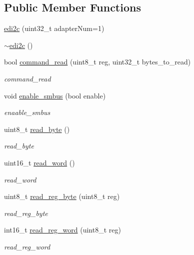 \subsection*{Public Member Functions}
\begin{DoxyCompactItemize}
\item 
\hyperlink{classedi2c_a1af1282b3a5c22f8690a2758bf3720bb}{edi2c} (uint32\-\_\-t adapter\-Num=1)
\item 
\hyperlink{classedi2c_a35e32414433c5b66109ade0da6f98079}{$\sim$edi2c} ()
\item 
bool \hyperlink{classedi2c_a24e263124eb80f5c841f8b804b69e943}{command\-\_\-read} (uint8\-\_\-t reg, uint32\-\_\-t bytes\-\_\-to\-\_\-read)
\begin{DoxyCompactList}\small\item\em command\-\_\-read \end{DoxyCompactList}\item 
void \hyperlink{classedi2c_a9c9e5492ab0aa7361e3871616dc1ee5e}{enable\-\_\-smbus} (bool enable)
\begin{DoxyCompactList}\small\item\em enaable\-\_\-smbus \end{DoxyCompactList}\item 
uint8\-\_\-t \hyperlink{classedi2c_a53cd636c8a9fd4ca54e5b0473cc8cb84}{read\-\_\-byte} ()
\begin{DoxyCompactList}\small\item\em read\-\_\-byte \end{DoxyCompactList}\item 
uint16\-\_\-t \hyperlink{classedi2c_a2b727b09d18b70cfd0466ce4d85a858b}{read\-\_\-word} ()
\begin{DoxyCompactList}\small\item\em read\-\_\-word \end{DoxyCompactList}\item 
uint8\-\_\-t \hyperlink{classedi2c_af72f531db5a7112e6da2d9e626932519}{read\-\_\-reg\-\_\-byte} (uint8\-\_\-t reg)
\begin{DoxyCompactList}\small\item\em read\-\_\-reg\-\_\-byte \end{DoxyCompactList}\item 
int16\-\_\-t \hyperlink{classedi2c_a0f5ed693ef1a4ecf95552d5fa459d839}{read\-\_\-reg\-\_\-word} (uint8\-\_\-t reg)
\begin{DoxyCompactList}\small\item\em read\-\_\-reg\-\_\-word \end{DoxyCompactList}\item 

\end{DoxyCompactItemize}
